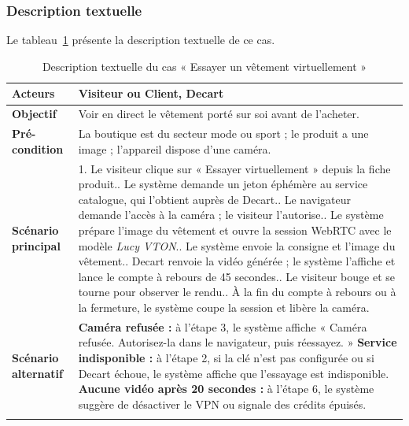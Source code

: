 \subsubsection{Description textuelle}
Le tableau~\ref{tab:uc-tryon} présente la description textuelle de ce cas.
\renewcommand{\arraystretch}{1.5}
\begin{longtable}{|p{4cm}|p{11cm}|}
\hline
\textbf{Acteurs} & Visiteur ou Client, Decart \\
\hline
\textbf{Objectif} & Voir en direct le vêtement porté sur soi avant de l'acheter. \\
\hline
\textbf{Pré-condition} & La boutique est du secteur mode ou sport ; le produit a une image ; l'appareil dispose d'une caméra. \\
\hline
\textbf{Scénario principal} &
1. Le visiteur clique sur « Essayer virtuellement » depuis la fiche produit.\newline
2. Le système demande un jeton éphémère au service catalogue, qui l'obtient auprès de Decart.\newline
3. Le navigateur demande l'accès à la caméra ; le visiteur l'autorise.\newline
4. Le système prépare l'image du vêtement et ouvre la session WebRTC avec le modèle \textit{Lucy VTON}.\newline
5. Le système envoie la consigne et l'image du vêtement.\newline
6. Decart renvoie la vidéo générée ; le système l'affiche et lance le compte à rebours de 45 secondes.\newline
7. Le visiteur bouge et se tourne pour observer le rendu.\newline
8. À la fin du compte à rebours ou à la fermeture, le système coupe la session et libère la caméra. \\
\hline
\textbf{Scénario alternatif} &
\textbf{Caméra refusée :} à l'étape 3, le système affiche « Caméra refusée. Autorisez-la dans le navigateur, puis réessayez. »\newline
\textbf{Service indisponible :} à l'étape 2, si la clé n'est pas configurée ou si Decart échoue, le système affiche que l'essayage est indisponible.\newline
\textbf{Aucune vidéo après 20 secondes :} à l'étape 6, le système suggère de désactiver le VPN ou signale des crédits épuisés. \\
\hline
\caption{Description textuelle du cas « Essayer un vêtement virtuellement »}
\label{tab:uc-tryon}
\end{longtable}

